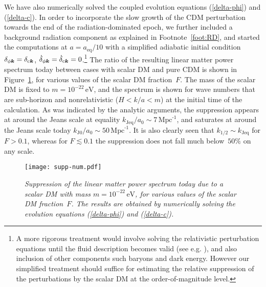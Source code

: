 \documentclass[11pt,nofootinbib]{article}
\numberwithin{equation}{section}
\begin{document}
We have also numerically solved the coupled evolution equations
(\ref{delta-phi}) and (\ref{delta-c}).
In order to incorporate the slow growth of the CDM
perturbation towards the end of the radiation-dominated epoch, 
we further included a background radiation component as explained in
Footnote~\ref{foot:RD},
and started the computations at $a = a_{\mathrm{eq}} / 10$
with a simplified adiabatic initial condition
$\delta_{\phi \boldsymbol{k}} = \delta_{\mathrm{c} \boldsymbol{k}}$,
$\dot{\delta}_{\phi \boldsymbol{k}} = \dot{\delta}_{\mathrm{c} \boldsymbol{k}} =
0$.\footnote{A more rigorous treatment would involve solving the 
relativistic perturbation equations until the fluid description becomes
valid (see
e.g. \cite{Khlopov:1985jw,Nambu:1989kh,Ratra:1990me,Hwang:1996xd}), and
also inclusion of other components such baryons and dark energy. 
However our simplified treatment should suffice for estimating
the relative suppression of the perturbations by the scalar DM at the
order-of-magnitude level.}
The ratio of the resulting linear matter power spectrum today between cases
with scalar DM and pure CDM is shown in Figure~\ref{fig:supp-num},
for various values of the scalar DM fraction~$F$. 
The mass of the scalar DM is fixed to $m = 10^{-22}\, \mathrm{eV}$,
and the spectrum is shown for wave numbers that are sub-horizon and
nonrelativistic ($H < k/a < m$) at the initial time of the calculation.
As was indicated by the analytic arguments, 
the suppression appears at around the Jeans scale at equality
$k_{\mathrm{Jeq}}/a_0 \sim 7 \, \mathrm{Mpc}^{\text{-}1}$,
and saturates at around the Jeans scale today
$k_{\mathrm{J} 0}/a_0 \sim 50 \, \mathrm{Mpc}^{\text{-}1}$.
It is also clearly seen that 
$k_{1/2} \sim k_{\mathrm{Jeq}}$ for $F > 0.1$,
whereas for $F \lesssim 0.1$ the suppression does not fall much
below~$50\%$ on any scale.


\begin{figure}[t]
  \begin{center}
  \begin{center}
  \texttt{[image: supp-num.pdf]}
  \end{center}
   \caption{\emph{Suppression of the linear matter power spectrum today due to
   a scalar DM with mass $m = 10^{-22}\, \mathrm{eV}$, for various
   values of the scalar DM fraction~$F$. The results are obtained by
   numerically solving the evolution equations (\ref{delta-phi}) and (\ref{delta-c}).}}
  \label{fig:supp-num}
  \end{center}
\end{figure}
\end{document}
